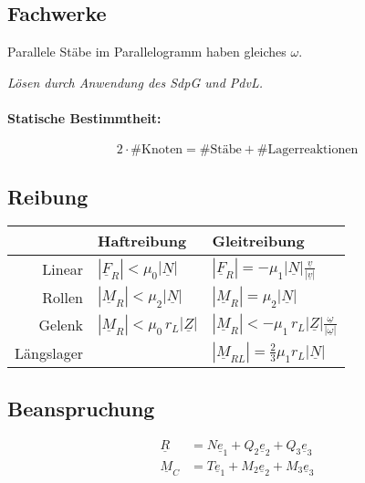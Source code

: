 \documentclass{article}
\begin{document}
\begin{multicols*}{4}
			\subsection{Fachwerke} %
				Parallele Stäbe im Parallelogramm haben gleiches $\omega$.
				
				\emph{Lösen durch Anwendung des SdpG und PdvL.}
				
				\paragraph{Statische Bestimmtheit:} %
					\[
						2 \cdot \text{\#Knoten} = \text{\#Stäbe} + \text{\#Lagerreaktionen}
					\]
			\subsection{Reibung} %
				\renewcommand{\arraystretch}{1.5}
				\addtolength{\tabcolsep}{-2pt}
				
				\hspace{-.5cm}
				\resizebox{7cm}{!} {
				\begin{tabular}{@{}rll@{}}
					 & Haftreibung & Gleitreibung \\
					\hline
					Linear     & $ |\underline{F}_R| < \mu_0 |\underline{N}| $        & $|\underline{F}_R| = - \mu_1 |\underline{N}| \frac{\underline{v}}{|\underline{v}|}$ \\
					Rollen     & $ |\underline{M}_R| < \mu_2 |\underline{N}| $        & $ |\underline{M}_R| = \mu_2 |\underline{N}| $ \\
					Gelenk     & $ |\underline{M}_R| < \mu_0 \, r_L |\underline{Z}| $ & $ |\underline{M}_R| < -\mu_1 \, r_L |\underline{Z}| \frac{\underline{\omega}}{|\underline{\omega}|} $ \\
					Längslager &  & $ |\underline{M}_{RL}| = \frac{2}{3} \mu_1 r_L |\underline{N}| $
				\end{tabular}
				}
				\renewcommand{\arraystretch}{1}
			\subsection{Beanspruchung} %
				\begin{align*}
					\underline{R} &= N\underline{e}_1 + Q_2 \underline{e}_2 + Q_3 \underline{e}_3 \\
					\underline{M}_C &= T \underline{e}_1 + M_2 \underline{e}_2 + M_3 \underline{e}_3
				\end{align*}

\end{multicols*}
\end{document}

